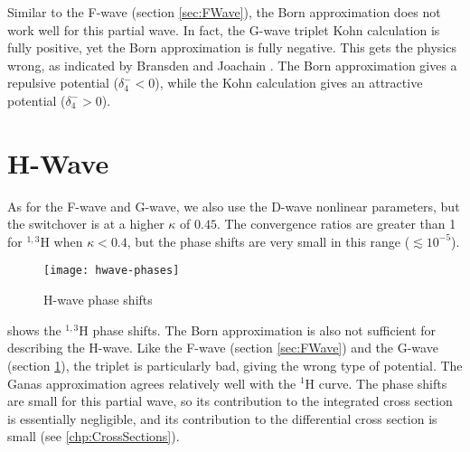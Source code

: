 \documentclass[Dissertation.tex]{subfiles}
\begin{document}
Similar to the F-wave (section \ref{sec:FWave}), the Born approximation 
does not work well for this partial wave. In fact, the G-wave triplet Kohn 
calculation is fully positive, yet the Born approximation is fully negative. 
This gets the physics wrong, as indicated by Bransden and Joachain
\citep[p.589]{Bransden2003}. The Born approximation gives a repulsive potential
($\delta_4^- < 0$), while the Kohn calculation gives an attractive potential
($\delta_4^- > 0$).


\section{H-Wave}
\label{sec:HWave}

As for the F-wave and G-wave, we also use the D-wave nonlinear
parameters, but the switchover is at a higher $\kappa$ of $0.45$.
The convergence ratios are greater than 1 for $^{1,3}$H when
$\kappa < 0.4$, but the phase shifts are very small in this range
($\lesssim 10^{-5}$). 

\begin{figure}[H]
	\centering
	\texttt{[image: hwave-phases]}
	\caption{H-wave phase shifts}
	\label{fig:HWavePhase}
\end{figure}


 shows the $^{1,3}$H phase shifts.
The Born approximation is also not sufficient for describing the H-wave. Like 
the F-wave (section \ref{sec:FWave}) and the G-wave (section \ref{sec:HWave}),
the triplet is particularly bad, giving the wrong type of potential.
The Ganas approximation agrees relatively well with the $^1$H curve. The 
phase shifts are small for this partial wave, so its contribution to the 
integrated cross section is essentially negligible, and its contribution
to the differential cross section is small (see \cref{chp:CrossSections}).
\end{document}
